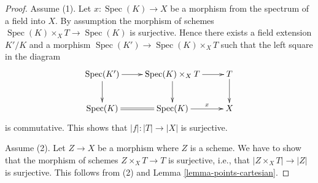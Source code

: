 \documentclass[10pt,a4paper]{amsart}
\theoremstyle{plain}
\theoremstyle{definition}
\theoremstyle{remark}
\numberwithin{equation}{subsection}
\def\Spec{\mathop{\mathrm{Spec}}}
\begin{document}
\begin{proof}
Assume (1). Let $x : \Spec(K) \to X$ be a morphism
from the spectrum of a field into $X$. By assumption the morphism of
schemes $\Spec(K) \times_X T \to \Spec(K)$ is surjective.
Hence there exists a field extension $K'/K$ and a morphism
$\Spec(K') \to \Spec(K) \times_X T$ such that the left
square in the diagram
$$
\xymatrix{
\Spec(K') \ar[r] \ar[d] &
\Spec(K) \times_X T \ar[d] \ar[r] &
T \ar[d] \\
\Spec(K) \ar@{=}[r] &
\Spec(K) \ar[r]^-x & X
}
$$
is commutative. This shows that $|f| : |T| \to |X|$ is surjective.

\medskip\noindent
Assume (2). Let $Z \to X$ be a morphism where $Z$ is
a scheme. We have to show that the morphism of schemes $Z \times_X T \to T$
is surjective, i.e., that $|Z \times_X T| \to |Z|$ is surjective.
This follows from (2) and
Lemma \ref{lemma-points-cartesian}.
\end{proof}
\end{document}
